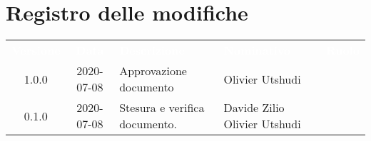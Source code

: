 \section*{Registro delle modifiche}
{
	\centering
	\begin{longtable}{ c c C{4cm}  C{4cm}  C{3cm} }
		\textcolor{white}{\textbf{Versione}} & \textcolor{white}{\textbf{Data}} & \textcolor{white}{\textbf{Descrizione}} & \textcolor{white}{\textbf{Nominativo}} & \textcolor{white}{\textbf{Ruolo}}\\		
		1.0.0 & 2020-07-08 & Approvazione documento & Olivier Utshudi &\RdP{}\\		
		0.1.0 & 2020-07-08 & Stesura e verifica documento. & Davide Zilio \newline Olivier Utshudi &\reda{} \newline \ver{} \\		
		
	\end{longtable}

}